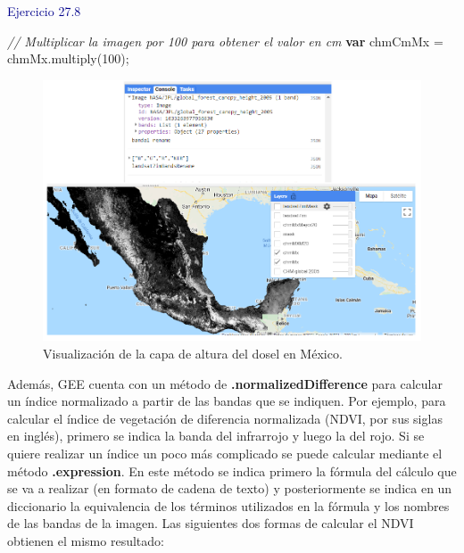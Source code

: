 \documentclass[
  12pt,
  letterpaper,
  twoside]{book}
\newenvironment{Shaded}{\begin{snugshade}}{\end{snugshade}}
\newcommand{\CommentTok}[1]{\textcolor[rgb]{0.24,0.58,0.00}{\textit{#1}}}
\newcommand{\DecValTok}[1]{\textcolor[rgb]{0.28,0.53,0.93}{#1}}
\newcommand{\FunctionTok}[1]{\textcolor[rgb]{0.48,0.12,0.64}{#1}}
\newcommand{\KeywordTok}[1]{\textcolor[rgb]{0.00,0.00,0.00}{\textbf{#1}}}
\newcommand{\NormalTok}[1]{#1}
\newcommand{\OperatorTok}[1]{\textcolor[rgb]{0.00,0.00,0.00}{#1}}
\newcommand\boldpurple[1]{\textcolor{darkpurple}{\textbf{#1}}}
\begin{document}
\textcolor{darkblue}{Ejercicio 27.8}

\begin{Shaded}
\begin{Highlighting}[]
\CommentTok{// Multiplicar la imagen por 100 para obtener el valor en cm}
\KeywordTok{var}\NormalTok{ chmCmMx }\OperatorTok{=}\NormalTok{ chmMx}\OperatorTok{.}\FunctionTok{multiply}\NormalTok{(}\DecValTok{100}\NormalTok{)}\OperatorTok{;}
\end{Highlighting}
\end{Shaded}

\begin{figure}[H]

{\centering \includegraphics[width=0.95\linewidth]{Img/ej276} 

}

\caption{Visualización de la capa de altura del dosel en México.}\label{fig:f96}
\end{figure}

Además, GEE cuenta con un método de \boldpurple{.normalizedDifference} para calcular un índice normalizado a partir de las bandas que se indiquen. Por ejemplo, para calcular el índice de vegetación de diferencia normalizada (NDVI, por sus siglas en inglés), primero se indica la banda del infrarrojo y luego la del rojo. Si se quiere realizar un índice un poco más complicado se puede calcular mediante el método \boldpurple{.expression}. En este método se indica primero la fórmula del cálculo que se va a realizar (en formato de cadena de texto) y posteriormente se indica en un diccionario la equivalencia de los términos utilizados en la fórmula y los nombres de las bandas de la imagen. Las siguientes dos formas de calcular el NDVI obtienen el mismo resultado:
\end{document}
